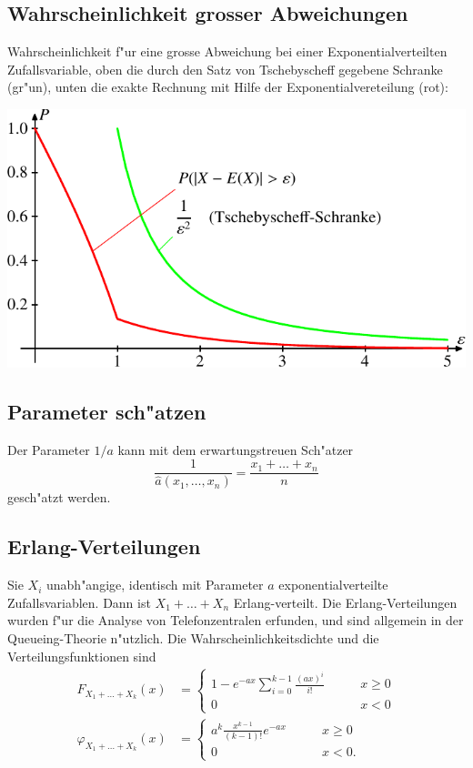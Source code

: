 \subsection{Wahrscheinlichkeit grosser Abweichungen}
Wahrscheinlichkeit f"ur eine grosse Abweichung bei einer
Exponentialverteilten Zufallsvariable, oben die durch den Satz von Tschebyscheff
gegebene Schranke (gr"un), unten die exakte Rechnung mit
Hilfe der Exponentialvereteilung (rot):
\begin{center}
\includegraphics{images/exp-1.pdf}
\end{center}

\subsection{Parameter sch"atzen}
Der Parameter $1/a$ kann mit dem erwartungstreuen Sch"atzer
\[
\frac1{\hat a(x_1,\dots,x_n)}=\frac{x_1+\dots+x_n}n
\]
gesch"atzt werden.

\subsection{Erlang-Verteilungen}
Sie $X_i$ unabh"angige, identisch mit Parameter $a$ exponentialverteilte
Zufallsvariablen.
Dann ist $X_1+\dots+X_n$ Erlang-verteilt. 
Die Erlang-Verteilungen wurden f"ur die Analyse von Telefonzentralen erfunden,
und sind allgemein in der Queueing-Theorie n"utzlich.
Die Wahrscheinlichkeitsdichte und die Verteilungsfunktionen sind
\begin{align*}
F_{X_1+\dots+X_k}(x)&=\begin{cases}
\displaystyle 1-e^{-ax}\sum_{i=0}^{k-1}\frac{(ax)^i}{i!}&\qquad x\ge 0\\
\displaystyle 0&\qquad x < 0
\end{cases}
\\
\varphi_{X_1+\dots+X_k}(x)&=\begin{cases}
\displaystyle a^k\frac{x^{k-1}}{(k-1)!}e^{-ax}&\qquad x\ge 0\\
\displaystyle 0&\qquad x<0.
\end{cases}
\end{align*}

